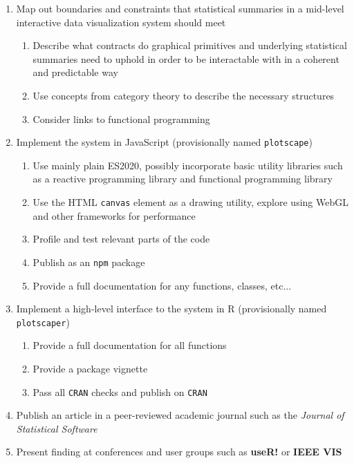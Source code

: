 \documentclass[12pt,a4paper]{article}
\begin{document}
\begin{enumerate}

\item
Map out boundaries and constraints that statistical summaries in a mid-level interactive data visualization system should meet
  \begin{enumerate}
  \item Describe what contracts do graphical primitives and underlying statistical summaries need to uphold in order to be interactable with in a coherent and predictable way
  \item Use concepts from category theory to describe the necessary structures
  \item Consider links to functional programming  
  \end{enumerate}

\item Implement the system in JavaScript (provisionally named \texttt{plotscape})
  \begin{enumerate}
  \item Use mainly plain ES2020, possibly incorporate basic utility libraries such as a reactive programming library and functional programming library
  \item Use the HTML \texttt{canvas} element as a drawing utility, explore using WebGL and other frameworks for performance
  \item Profile and test relevant parts of the code
  \item Publish as an \texttt{npm} package
  \item Provide a full documentation for any functions, classes, etc...
  \end{enumerate}

\item Implement a high-level interface to the system in R (provisionally named \texttt{plotscaper})
  \begin{enumerate}
  \item Provide a full documentation for all functions
  \item Provide a package vignette
  \item Pass all \texttt{CRAN} checks and publish on \texttt{CRAN} 
  \end{enumerate}
  
\item Publish an article in a peer-reviewed academic journal such as the \textit{Journal of Statistical Software}

\item Present finding at conferences and user groups such as \textbf{useR!} or \textbf{IEEE VIS}

\end{enumerate}
\end{document}
